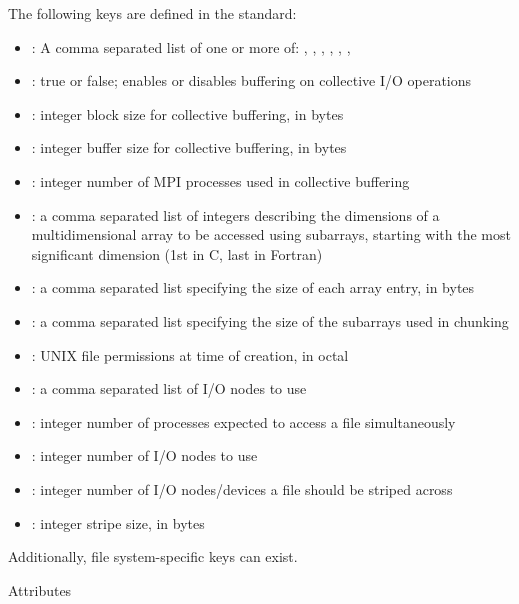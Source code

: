 The following keys are defined in the  standard:
\begin{itemize}
\item {}: A comma separated list of one or
  more of: , , ,
  , , , 
\item {}: true or false; enables or disables buffering on collective I/O operations
\item {}: integer block size for collective buffering, in bytes
\item {}: integer buffer size for collective buffering, in bytes
\item {}: integer number of MPI processes used in collective buffering
\item {}: a comma separated list of integers describing the dimensions of a multidimensional array to be accessed using subarrays, starting with the most significant dimension (1st in C, last in Fortran)
\item {}: a comma separated list specifying the size of each array entry, in bytes
\item {}: a comma separated list specifying the size of the subarrays used in chunking
\item {}: UNIX file permissions at time of creation, in octal
\item {}: a comma separated list of I/O nodes to use
\item {}: integer number of processes expected to access a file simultaneously
\item {}: integer number of I/O nodes to use
\item {}: integer number of I/O nodes/devices a file should be striped across
\item {}: integer stripe size, in bytes
\end{itemize}
Additionally, file system-specific keys can exist.

 {Attributes}
\label{sec:mpi_attr}

